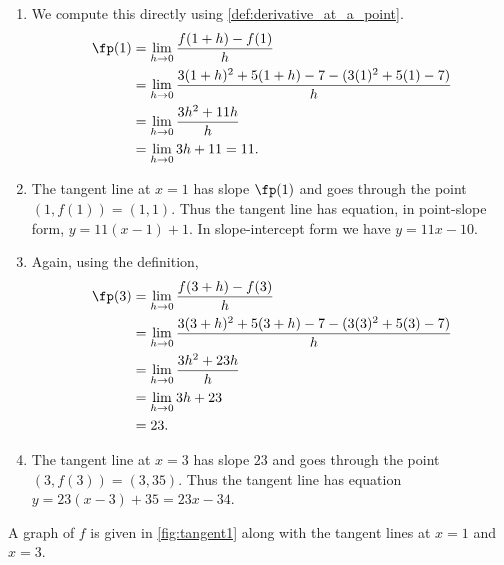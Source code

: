 %
{	\begin{enumerate}
	\item We compute this directly using \autoref{def:derivative_at_a_point}.
		\begin{align*}
			\fp(1) &= \lim_{h\to 0} \frac{f(1+h)-f(1)}{h} \\
				   &= \lim_{h\to 0} \frac{3(1+h)^2+5(1+h)-7 - (3(1)^2+5(1)-7)}{h}\\
				   &= \lim_{h\to 0} \frac{3h^2+11h}{h}\\
				   &= \lim_{h\to 0} 3h+11=11.%
		\end{align*}
	\item The tangent line at $x=1$ has slope $\fp(1)$ and goes through the point $(1,f(1)) = (1,1)$. Thus the tangent line has equation, in point-slope form, $y = 11(x-1) + 1$. In slope-intercept form we have $y = 11x-10$.
	\item Again, using the definition,
		\begin{align*}
			\fp(3) &= \lim_{h\to 0} \frac{f(3+h)-f(3)}{h} \\
				   &= \lim_{h\to 0} \frac{3(3+h)^2+5(3+h)-7 - (3(3)^2+5(3)-7)}{h} \\
				   &= \lim_{h\to 0} \frac{3h^2+23h}{h}\\
				   &= \lim_{h\to 0} 3h+23 \\
				   &= 23.
		\end{align*}
	\item The tangent line at $x=3$ has slope $23$ and goes through the point $(3,f(3)) = (3,35)$. Thus the tangent line has equation $y=23(x-3)+35 = 23x-34$.
	\end{enumerate}


A graph of $f$ is given in \autoref{fig:tangent1} along with the tangent lines at $x=1$ and $x=3$.}

